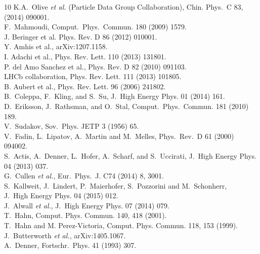 \begin{thebibliography}{10}
K.A.~Olive {\it et al.} (Particle Data Group Collaboration), Chin. Phys.~C 83, (2014) 090001.
\\
F.~Mahmoudi, Comput.~Phys.~Commun. 180 (2009) 1579.
\\
J. Beringer et al. Phys. Rev. D 86 (2012) 010001.
\\
Y. Amhis et al., arXiv:1207.1158.
\\
I. Adachi et al., Phys. Rev. Lett. 110 (2013) 131801.
\\
P. del Amo Sanchez et al., Phys. Rev. D 82 (2010) 091103.
\\
LHCb collaboration, Phys. Rev. Lett. 111 (2013) 101805.
\\
B. Aubert et al., Phys. Rev. Lett. 96 (2006) 241802.
\\
B.~Coleppa, F.~Kling, and S.~Su,  J.~High Energy Phys. 01 (2014) 161. 
\\
D.~Eriksson, J.~Rathsman, and O.~Stal, Comput.~Phys.~Commun. 181 (2010) 189.
\\
V.~Sudakov, Sov.~Phys. JETP 3 (1956) 65.
\\
V.~Fadin, L.~Lipatov, A.~Martin and M.~Melles, Phys.~Rev.~D 61 (2000) 094002.
\\
S.~Actis, A.~Denner, L.~Hofer, A.~Scharf, and S.~Uccirati, J.~High Energy Phys. 04 (2013) 037.
\\
G.~Cullen {\it et al.}, Eur.~Phys.~J. C74 (2014) 8, 3001.
\\
S.~Kallweit, J.~Lindert, P.~Maierhofer, S.~Pozzorini and M.~Schonherr,  
\\
J.~High Energy Phys. 04 (2015) 012.
\\
J.~Alwall {\it et al.}, J.~High Energy Phys. 07 (2014) 079.
\\
T.~Hahn, Comput. Phys. Commun. 140, 418 (2001).
\\
T.~Hahn and M. Perez-Victoria, Comput. Phys. Commun. 118, 153 (1999).
\\
J.~Butterworth {\it et al.}, arXiv:1405.1067.
\\
A.~Denner, Fortschr.~Phys. 41 (1993) 307.
\\

\end{thebibliography}
